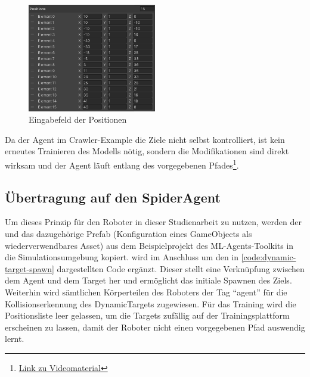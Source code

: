 \begin{figure}
    \centering
    \includegraphics[width = 0.5\textwidth]{Bilder/crawler/position-list.png}
    \caption{Eingabefeld der Positionen}
    \label{fig:eingabefeld-positionen}
\end{figure}

Da der Agent im Crawler-Example die Ziele nicht selbst kontrolliert, ist kein erneutes Trainieren des Modells nötig, sondern die Modifikationen sind direkt wirksam und der Agent läuft entlang des vorgegebenen Pfades\footnote{\href{https://github.com/yschiebelhut/studienarbeit-doc/raw/master/Videos/crawler-poc.webm}{Link zu Videomaterial}}.

\subsection{Übertragung auf den SpiderAgent}
Um dieses Prinzip für den Roboter in dieser Studienarbeit zu nutzen, werden der  und das dazugehörige Prefab (Konfiguration eines GameObjects als wiederverwendbares Asset) aus dem Beispielprojekt des ML-Agents-Toolkits in die Simulationsumgebung kopiert.
 wird im Anschluss um den in \autoref{code:dynamic-target-spawn} dargestellten Code ergänzt.
Dieser stellt eine Verknüpfung zwischen dem Agent und dem Target her und ermöglicht das initiale Spawnen des Ziels.
Weiterhin wird sämtlichen Körperteilen des Roboters der Tag \enquote{agent} für die Kollisionserkennung des DynamicTargets zugewiesen.
Für das Training wird die Positionsliste leer gelassen, um die Targets zufällig auf der Trainingsplattform erscheinen zu lassen, damit der Roboter nicht einen vorgegebenen Pfad auswendig lernt.


\begin{figure}
    
\end{figure}

